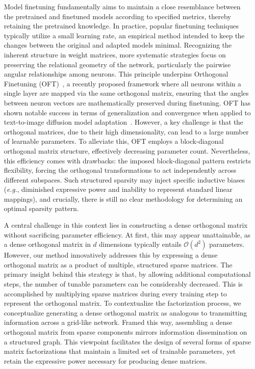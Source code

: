 Model finetuning fundamentally aims to maintain a close resemblance between the pretrained and finetuned models according to specified metrics, thereby retaining the pretrained knowledge. In practice, popular finetuning techniques typically utilize a small learning rate, an empirical method intended to keep the changes between the original and adapted models minimal. Recognizing the inherent structure in weight matrices, more systematic strategies focus on preserving the relational geometry of the network, particularly the pairwise angular relationships among neurons. This principle underpins Orthogonal Finetuning (OFT)~\cite{qiu2023controlling}, a recently proposed framework where all neurons within a single layer are mapped via the same orthogonal matrix, ensuring that the angles between neuron vectors are mathematically preserved during finetuning. OFT has shown notable success in terms of generalization and convergence when applied to text-to-image diffusion model adaptation~\cite{qiu2023controlling}. However, a key challenge is that the orthogonal matrices, due to their high dimensionality, can lead to a large number of learnable parameters. To alleviate this, OFT employs a block-diagonal orthogonal matrix structure, effectively decreasing parameter count. Nevertheless, this efficiency comes with drawbacks: the imposed block-diagonal pattern restricts flexibility, forcing the orthogonal transformations to act independently across different subspaces. Such structured sparsity may inject specific inductive biases (\emph{e.g.}, diminished expressive power and inability to represent standard linear mappings), and crucially, there is still no clear methodology for determining an optimal sparsity pattern.

A central challenge in this context lies in constructing a dense orthogonal matrix without sacrificing parameter efficiency. At first, this may appear unattainable, as a dense orthogonal matrix in $d$ dimensions typically entails $\mathcal{O}(d^2)$ parameters. However, our method innovatively addresses this by expressing a dense orthogonal matrix as a product of multiple, structured sparse matrices. The primary insight behind this strategy is that, by allowing additional computational steps, the number of tunable parameters can be considerably decreased. This is accomplished by multiplying sparse matrices during every training step to represent the orthogonal matrix. To contextualize the factorization process, we conceptualize generating a dense orthogonal matrix as analogous to transmitting information across a grid-like network. Framed this way, assembling a dense orthogonal matrix from sparse components mirrors information dissemination on a structured graph. This viewpoint facilitates the design of several forms of sparse matrix factorizations that maintain a limited set of trainable parameters, yet retain the expressive power necessary for producing dense matrices.

